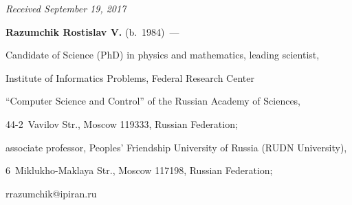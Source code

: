 \vspace*{-6pt}





\hfill{\small\textit{Received September 19, 2017}}










\Contrl





\noindent


\textbf{Razumchik Rostislav V.} (b.\ 1984)~--- 


Candidate of Science (PhD) in physics and mathematics, leading scientist, 


Institute of Informatics Problems, Federal Research Center 


``Computer Science and Control'' of the Russian Academy of Sciences, 


44-2~Vavilov Str., Moscow 119333, Russian Federation; 


associate professor, Peoples' Friendship University of Russia (RUDN University), 


6~Miklukho-Maklaya Str., Moscow 117198, Russian Federation; 


\mbox{rrazumchik@ipiran.ru}




\label{end\stat}








\renewcommand{\bibname}{\protect\rm Литература} 


